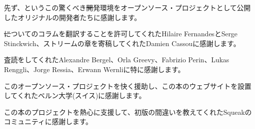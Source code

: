 \documentclass[a4paper,10pt,twoside]{book}
\begin{document}
先ず、\squeak というこの驚くべき\st 開発環境をオープンソース・プロジェクトとして公開したオリジナルの開発者たちに感謝します。

\st についてのコラムを翻訳することを許可してくれたHilaire FernandesとSerge Stinckwich、ストリームの章を寄稿してくれたDamien Cassouに感謝します。

査読をしてくれたAlexandre Bergel、Orla Greevy、Fabrizio Perin、Lukas Renggli、Jorge Ressia、Erwann Wernliに特に感謝します。

このオープンソース・プロジェクトを快く援助し、この本のウェブサイトを設置してくれたベルン大学(スイス)に感謝します。

この本のプロジェクトを熱心に支援して、初版の間違いを教えてくれたSqueakのコミュニティに感謝します。

\ifx\wholebook\relax\else
   
   
\end{document}
